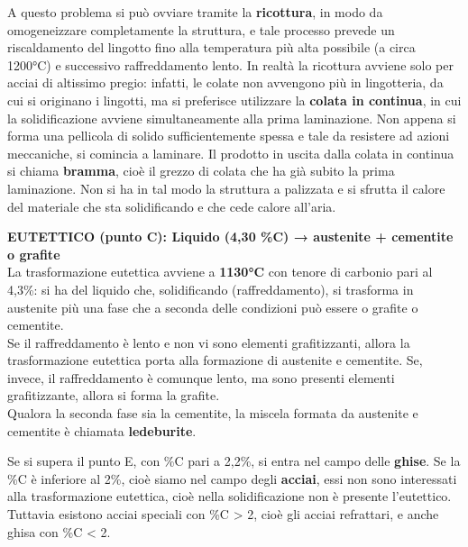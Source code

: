 A questo problema si può ovviare tramite la \textbf{ricottura}, in modo da omogeneizzare completamente la struttura, e tale processo prevede un riscaldamento del lingotto fino alla temperatura più alta possibile (a circa 1200°C) e successivo raffreddamento lento. In realtà la ricottura avviene solo per acciai di altissimo pregio: infatti, le colate non avvengono più in lingotteria, da cui si originano i lingotti, ma si preferisce utilizzare la \textbf{colata in continua}, in cui la solidificazione avviene simultaneamente alla prima laminazione. Non appena si forma una pellicola di solido sufficientemente spessa e tale da resistere ad azioni meccaniche, si comincia a laminare. Il prodotto in uscita dalla colata in continua si chiama \textbf{bramma}, cioè il grezzo di colata che ha già subito la prima laminazione. Non si ha in tal modo la struttura a palizzata e si sfrutta il calore del materiale che sta solidificando e che cede calore all’aria.

\textbf{EUTETTICO (punto C): Liquido (4,30 \%C) → austenite + cementite  o grafite}\\
La trasformazione eutettica avviene a \textbf{1130°C} con tenore di carbonio pari al 4,3\%: si ha del liquido che, solidificando (raffreddamento), si trasforma in austenite più una fase che a seconda delle condizioni può essere o grafite o cementite.\\
Se il raffreddamento è lento e non vi sono elementi grafitizzanti, allora la trasformazione eutettica porta alla formazione di austenite e cementite. Se, invece, il raffreddamento è comunque lento, ma sono presenti elementi grafitizzante, allora si forma la grafite.\\
Qualora la seconda fase sia la cementite, la miscela formata da austenite e cementite è chiamata \textbf{ledeburite}.

Se si supera il punto E, con \%C pari a 2,2\%, si entra nel campo delle \textbf{ghise}. Se la \%C è inferiore al 2\%, cioè siamo nel campo degli \textbf{acciai}, essi non sono interessati alla trasformazione eutettica, cioè nella solidificazione non è presente l’eutettico. Tuttavia esistono acciai speciali con \%C > 2, cioè gli acciai refrattari, e anche ghisa con \%C < 2.

